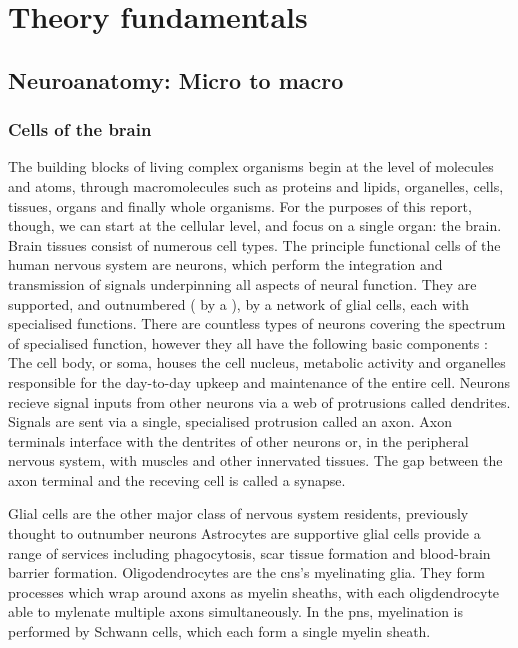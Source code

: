\section{Theory fundamentals}
\label{theory}


\subsection{Neuroanatomy: Micro to macro}

\subsubsection{Cells of the brain}


The building blocks of living complex organisms begin at the level of molecules and atoms, through macromolecules such as proteins and lipids, organelles, cells, tissues, organs and finally whole organisms.
For the purposes of this report, though, we can start at the cellular level, and focus on a single organ: the brain.
Brain tissues consist of numerous cell types.
The principle functional cells of the human nervous system are neurons, which perform the integration and transmission of signals underpinning all aspects of neural function.
They are supported, and outnumbered ( by a ), by a network of glial cells, each with specialised functions.
There are countless types of neurons covering the spectrum of specialised function, however they all have the following basic components :
The cell body, or soma, houses the cell nucleus, metabolic activity and organelles responsible for the day-to-day upkeep and maintenance of the entire cell.
Neurons recieve signal inputs from other neurons via a web of protrusions called dendrites. 
Signals are sent via a single, specialised protrusion called an axon.
Axon terminals interface with the dentrites of other neurons or, in the peripheral nervous system, with muscles and other innervated tissues.
The  gap between the axon terminal and the receving cell is called a synapse.

Glial cells are the other major class of nervous system residents, previously thought to outnumber neurons 
Astrocytes are supportive glial cells provide a range of services including phagocytosis, scar tissue formation and blood-brain barrier formation.
Oligodendrocytes are the \gls{cns}'s myelinating glia.
They form processes which wrap around axons as myelin sheaths, with each oligdendrocyte able to mylenate multiple axons simultaneously.
In the \gls{pns}, myelination is performed by Schwann cells, which each form a single myelin sheath.

